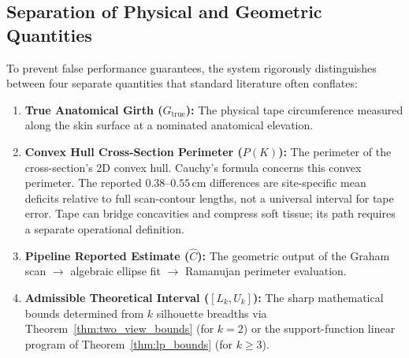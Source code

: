 \documentclass[journal]{IEEEtran}
\begin{document}
\subsection{Separation of Physical and Geometric Quantities}
To prevent false performance guarantees, the system rigorously distinguishes between four separate quantities that standard literature often conflates:
\begin{enumerate}
    \item \textbf{True Anatomical Girth ($G_{\text{true}}$):} The physical tape circumference measured along the skin surface at a nominated anatomical elevation.
    \item \textbf{Convex Hull Cross-Section Perimeter ($P(K)$):} The perimeter of the cross-section's 2D convex hull. Cauchy's formula concerns this convex perimeter. The reported $0.38$--$0.55$\,cm differences are site-specific mean deficits relative to full scan-contour lengths, not a universal interval for tape error. Tape can bridge concavities and compress soft tissue; its path requires a separate operational definition.
    \item \textbf{Pipeline Reported Estimate ($\hat{C}$):} The geometric output of the Graham scan $\to$ algebraic ellipse fit $\to$ Ramanujan perimeter evaluation.
    \item \textbf{Admissible Theoretical Interval ($[L_k, U_k]$):} The sharp mathematical bounds determined from $k$ silhouette breadths via Theorem~\ref{thm:two_view_bounds} (for $k=2$) or the support-function linear program of Theorem~\ref{thm:lp_bounds} (for $k \ge 3$).
\end{enumerate}
\end{document}
